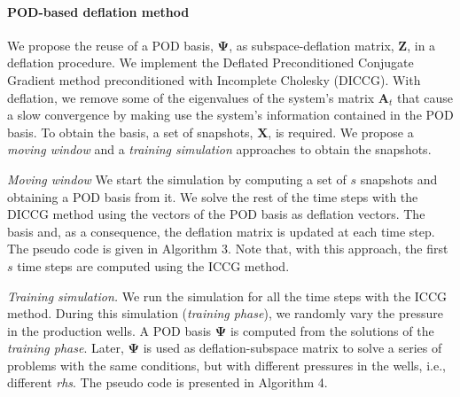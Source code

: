 \documentclass[times,final]{elsarticle}
\begin{document}
\paragraph{POD-based deflation method}  We propose the reuse of a POD basis, $\mathbf{\Psi}$, as subspace-deflation matrix, $\mathbf{Z}$, in a deflation procedure. We implement the Deflated Preconditioned Conjugate Gradient method preconditioned with Incomplete Cholesky (DICCG). With deflation, we remove some of the eigenvalues of the system's matrix $\mathbf{A}_t$ that cause a slow convergence by making use the system's information contained in the POD basis. To obtain the basis, a set of snapshots, $\mathbf{X}$, is required. We propose a \emph{moving window} and a \emph{training simulation} approaches to obtain the snapshots.\par
\emph{Moving window} We start the simulation by computing a set of $s$ snapshots and obtaining a POD basis from it. We solve the rest of the time steps with the DICCG method using the vectors of the POD basis as deflation vectors. The basis and, as a consequence, the deflation matrix is updated at each time step.  
The pseudo code is given in Algorithm 3. Note that, with this approach, the first $s$ time steps are computed using the ICCG method. \par 
\emph{Training simulation.} We run the simulation for all the time steps with the ICCG method. During this simulation (\emph{training phase}), we randomly vary the pressure in the production wells. A POD basis $\mathbf{\Psi}$ is computed from the solutions of the \emph{training phase}. Later, $\mathbf{\Psi}$ is used as deflation-subspace matrix to solve a series of problems with the same conditions, but with different pressures in the wells, i.e., different \emph{rhs}. The pseudo code is presented in Algorithm 4.  \par
\end{document}

